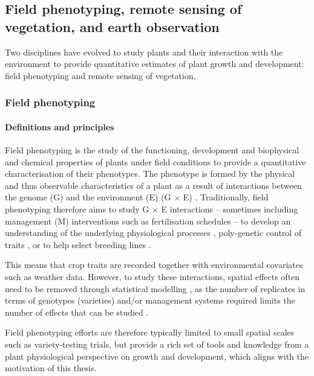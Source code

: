 \subsection{Field phenotyping, remote sensing of vegetation, and earth observation}
\label{subsec:field-phenotyping-rs-eo}

Two disciplines have evolved to study plants and their interaction with the environment to provide quantitative estimates of plant growth and development: field phenotyping and remote sensing of vegetation.

\subsubsection{Field phenotyping}
\label{subsubsec:intro-field-phenotyping}
\paragraph{Definitions and principles}
Field phenotyping is the study of the functioning, development and biophysical and chemical properties of plants under field conditions \citep{walter_plant_2015} to provide a quantitative characterisation of their phenotypes. The phenotype is formed by the physical and thus observable characteristics of a plant as a result of interactions between the genome (G) and the environment (E) (G $\times$ E) \citep{johannsen_genotype_1911}. Traditionally, field phenotyping therefore aims to study G $\times$ E interactions -- sometimes including management (M) interventions such as fertilisation schedules \citep[for example]{rodene_uavbased_2022} -- to develop an understanding of the underlying physiological processes \citep{york_functional_2019}, poly-genetic control of traits \citep[for example]{singh_high-throughput_2019}, or to help select breeding lines \citep{pask_physiological_2012,roth_image-based_2023}.

This means that crop traits are recorded together with environmental covariates such as weather data. However, to study these interactions, spatial effects often need to be removed through statistical modelling \citep{piepho_twodimensional_2022}, as the number of replicates in terms of genotypes (varieties) and/or management systems required limits the number of effects that can be studied \citep{poorter_plant_1996}. 

Field phenotyping efforts are therefore typically limited to small spatial scales such as variety-testing trials, but provide a rich set of tools and knowledge from a plant physiological perspective on growth and development, which aligns with the motivation of this thesis.

